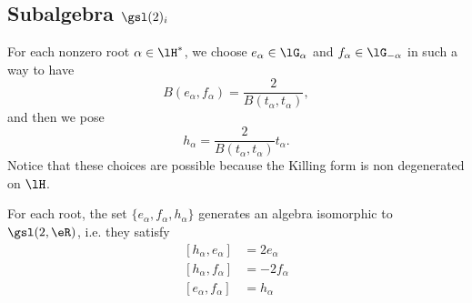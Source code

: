 \subsection{Subalgebra \texorpdfstring{$ \gsl(2)_i$}{SL2R} }
\label{SubSecCopiedeSLdansGi}

For each nonzero root \( \alpha\in\lH^*\), we choose \( e_{\alpha}\in\lG_{\alpha}\) and \( f_{\alpha}\in\lG_{-\alpha}\) in such a way to have
\begin{equation}
    B(e_{\alpha},f_{\alpha})=\frac{ 2 }{ B(t_{\alpha},t_{\alpha}) },
\end{equation}
and then we pose
\begin{equation}
    h_{\alpha}=\frac{ 2 }{ B(t_{\alpha},t_{\alpha}) }t_{\alpha}.
\end{equation}
Notice that these choices are possible because the Killing form is non degenerated on \( \lH\).

\begin{proposition} \label{PropWEzZYzC}
    For each root, the set $\{ e_{\alpha},f_{\alpha},h_{\alpha} \}$ generates an algebra isomorphic to $\gsl(2,\eR)$, i.e. they satisfy
    \begin{subequations}
        \begin{align}
            [h_{\alpha},e_{\alpha}]&=2e_{\alpha}\\
            [h_{\alpha},f_{\alpha}]&=-2f_{\alpha}\\
            [e_{\alpha},f_{\alpha}]&=h_{\alpha}\\
        \end{align}
    \end{subequations}
\end{proposition}

